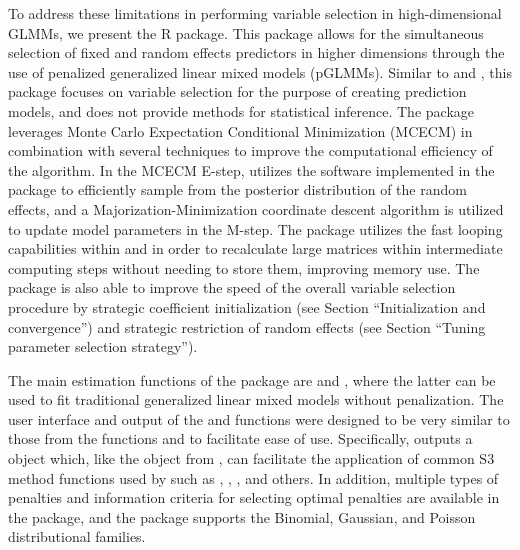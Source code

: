 To address these limitations in performing variable selection in high-dimensional GLMMs, we present the  R package. This package allows for the simultaneous selection of fixed and random effects predictors in higher dimensions through the use of penalized generalized linear mixed models (pGLMMs). Similar to  and , this package focuses on variable selection for the purpose of creating prediction models, and does not provide methods for statistical inference.
The package leverages Monte Carlo Expectation Conditional Minimization (MCECM) in combination with several techniques to improve the computational efficiency of the  algorithm. In the MCECM E-step,  utilizes the  software implemented in the  package to efficiently sample from the posterior distribution of the random effects, and a Majorization-Minimization coordinate descent algorithm is utilized to update model parameters in the M-step. The  package utilizes the fast looping capabilities within  and  in order to recalculate large matrices within intermediate computing steps without needing to store them, improving memory use. The  package is also able to improve the speed of the overall variable selection procedure by strategic coefficient initialization (see Section ``Initialization and convergence'') and strategic restriction of random effects (see Section ``Tuning parameter selection strategy''). 

The main estimation functions of the package are   and , where the latter can be used to fit traditional generalized linear mixed models without penalization. The user interface and output of the  and  functions were designed to be very similar to those from the functions  and  to facilitate ease of use. Specifically,  outputs a  object which, like the  object from , can facilitate the application of common S3 method functions used by  such as , , , and others. In addition, multiple types of penalties and information criteria for selecting optimal penalties are available in the package, and the package supports the Binomial, Gaussian, and Poisson distributional families.


